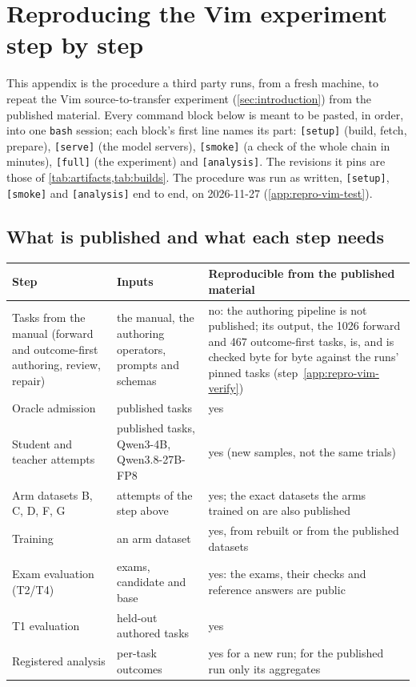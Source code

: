 
\section{Reproducing the Vim experiment step by step}\label{app:repro-vim}

\begin{sloppypar}
This appendix is the procedure a third party runs, from a fresh machine, to repeat the Vim source-to-transfer experiment
(\cref{sec:introduction}) from the published material. Every command block below is meant to be pasted, in order, into one
\texttt{bash} session; each block's first line names its part: \texttt{[setup]} (build, fetch, prepare), \texttt{[serve]}
(the model servers), \texttt{[smoke]} (a check of the whole chain in minutes), \texttt{[full]} (the experiment) and
\texttt{[analysis]}. The revisions it pins are those of \cref{tab:artifacts,tab:builds}. The procedure was run as written,
\texttt{[setup]}, \texttt{[smoke]} and \texttt{[analysis]} end to end, on 2026-11-27 (\cref{app:repro-vim-test}).
\end{sloppypar}

\subsection{What is published and what each step needs}\label{app:repro-vim-scope}

\begin{center}\footnotesize
\begin{tabular}{>{\raggedright\arraybackslash}p{38mm}>{\raggedright\arraybackslash}p{56mm}>{\raggedright\arraybackslash}p{50mm}}
\toprule
Step & Inputs & Reproducible from the published material \\
\midrule
Tasks from the manual (forward and outcome-first authoring, review, repair) & the manual, the authoring operators, prompts and
schemas & no: the authoring pipeline is not published; its output, the 1026 forward and 467 outcome-first tasks, is, and is
checked byte for byte against the runs' pinned tasks (step~\ref{app:repro-vim-verify}) \\
Oracle admission & published tasks & yes \\
Student and teacher attempts & published tasks, Qwen3-4B, Qwen3.8-27B-FP8 & yes (new samples, not the same trials) \\
Arm datasets B, C, D, F, G & attempts of the step above & yes; the exact datasets the arms trained on are also published \\
Training & an arm dataset & yes, from rebuilt or from the published datasets \\
Exam evaluation (T2/T4) & 100 exams, candidate and base & yes: the exams, their checks and reference answers are public \\
T1 evaluation & held-out authored tasks & yes \\
Registered analysis & per-task outcomes & yes for a new run; for the published run only its aggregates \\
\bottomrule
\end{tabular}
\end{center}

